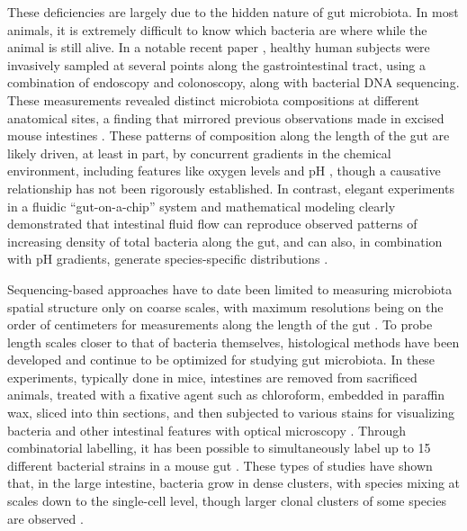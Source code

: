 These deficiencies are largely due to the hidden nature of gut microbiota. In most animals, it is extremely difficult to know which bacteria are where while the animal is still alive. In a notable recent paper \cite{zmora2018personalized}, healthy human subjects were invasively sampled at several points along the gastrointestinal tract, using a combination of endoscopy and colonoscopy, along with bacterial DNA sequencing. These measurements revealed distinct microbiota compositions at different anatomical sites, a finding that mirrored previous observations made in excised mouse intestines \cite{donaldson_gut_2015}. These patterns of composition along the length of the gut are likely driven, at least in part, by concurrent gradients in the chemical environment, including features like oxygen levels and pH \cite{donaldson_gut_2015}, though a causative relationship has not been rigorously established. In contrast, elegant experiments in a fluidic “gut-on-a-chip” system and mathematical modeling clearly demonstrated that intestinal fluid flow can reproduce observed patterns of increasing density of total bacteria along the gut, and can also, in combination with pH gradients, generate species-specific distributions \cite{cremer_effect_2016}.

Sequencing-based approaches have to date been limited to measuring microbiota spatial structure only on coarse scales, with maximum resolutions being on the order of centimeters for measurements along the length of the gut \cite{donaldson_gut_2015}. To probe length scales closer to that of bacteria themselves, histological methods have been developed and continue to be optimized for studying gut microbiota. In these experiments, typically done in mice, intestines are removed from sacrificed animals, treated with a fixative agent such as chloroform, embedded in paraffin wax, sliced into thin sections, and then subjected to various stains for visualizing bacteria and other intestinal features with optical microscopy \cite{tropini_gut_2017}. Through combinatorial labelling, it has been possible to simultaneously label up to 15 different bacterial strains in a mouse gut \cite{welch_spatial_2017}. These types of studies have shown that, in the large intestine, bacteria grow in dense clusters, with species mixing at scales down to the single-cell level, though larger clonal clusters of some species are observed \cite{welch_spatial_2017}. 

